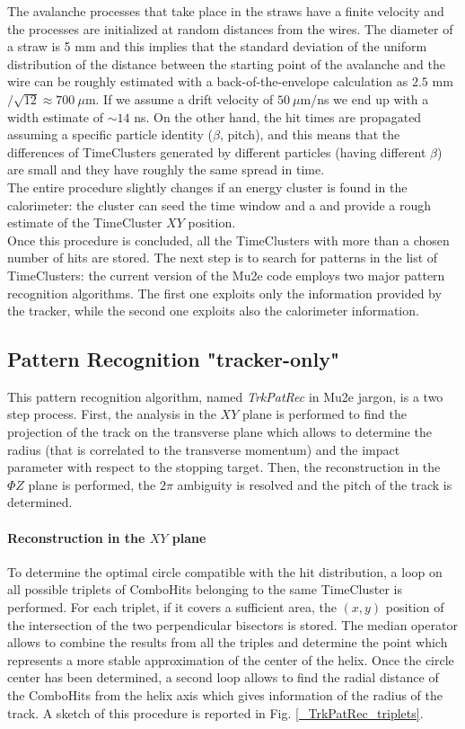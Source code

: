\documentclass[12pt,a4paper,openright, oneside, titlepage]{book} %
\begin{document}
\noindent The avalanche processes that take place in the straws have a finite velocity 
and the processes are initialized at random distances from the wires. 
The diameter of a straw is 5 mm and this implies that the standard deviation 
of the uniform distribution of the distance between the starting point of the avalanche and the wire 
can be roughly estimated with a back-of-the-envelope calculation as $2.5$ mm$/\sqrt{12}\approx 700\ \mu$m. 
If we assume a drift velocity of $50\ \mu$m/ns we end up with a width estimate of $\sim 14$ ns. 
On the other hand, the hit times are propagated assuming a specific particle identity ($\beta$, pitch), 
and this means that the differences of TimeClusters generated by different particles (having different $\beta$) 
are small and they have roughly the same spread in time.\\
The entire procedure slightly changes if an energy cluster is found in the calorimeter: 
the cluster can seed the time window and a and provide a rough estimate of the TimeCluster $XY$ position.\\

\noindent Once this procedure is concluded, all the TimeClusters with more than a chosen number of hits are stored. 
The next step is to search for patterns in the list of TimeClusters:  the current version of the Mu2e code employs two major pattern recognition algorithms. 
The first one exploits only the information provided by the tracker, while the second one exploits also the calorimeter information.

\subsection{Pattern Recognition "tracker-only"}
This pattern recognition algorithm, named \textit{TrkPatRec} in Mu2e jargon, 
is a two step process. 
First, the analysis in the $XY$ plane is performed to find the projection of the track on the transverse plane 
which allows to determine the radius (that is correlated to the transverse momentum) 
and the impact parameter with respect to the stopping target. 
Then, the reconstruction in the $\Phi Z$ plane is performed, 
the $2\pi$ ambiguity is resolved and the pitch of the track is determined.

\paragraph{Reconstruction in the $XY$ plane} To determine the optimal circle compatible with the hit distribution, 
a loop on all possible triplets of ComboHits belonging to the same TimeCluster is performed. 
For each triplet, if it covers a sufficient area, the $(x,y)$ position of the intersection 
of the two perpendicular bisectors is stored. 
The median operator allows to combine the results from all the triples and determine 
the point which represents a more stable approximation of the center of the helix. 
Once the circle center has been determined, 
a second loop allows to find the radial distance of the ComboHits from the helix axis 
which gives information of the radius of the track. 
A sketch of this procedure is reported in Fig. \ref{_TrkPatRec_triplets}.
\end{document}
